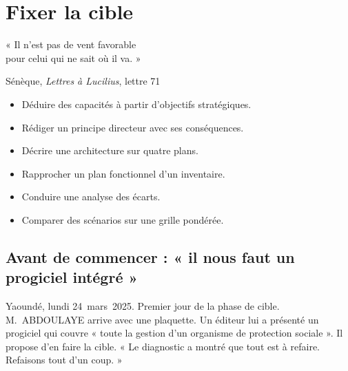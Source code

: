 
\chapter{Fixer la cible}
\label{chap:cible}

\epigraph{%
    « Il n'est pas de vent favorable\\
    pour celui qui ne sait où il va. »%
}{Sénèque, \textit{Lettres à Lucilius}, lettre 71}


\begin{boxobjectifs}
\begin{itemize}
    \item Déduire des capacités à partir d'objectifs stratégiques.
    \item Rédiger un principe directeur avec ses conséquences.
    \item Décrire une architecture sur quatre plans.
    \item Rapprocher un plan fonctionnel d'un inventaire.
    \item Conduire une analyse des écarts.
    \item Comparer des scénarios sur une grille pondérée.
\end{itemize}
\end{boxobjectifs}

\bigskip

\section*{Avant de commencer : « il nous faut un progiciel intégré »}

Yaoundé, lundi 24~mars~2025. Premier jour de la phase de cible. M.~ABDOULAYE arrive avec une plaquette. Un
éditeur lui a présenté un progiciel qui couvre « toute la gestion d'un organisme de protection sociale ». Il
propose d'en faire la cible. « Le diagnostic a montré que tout est à refaire. Refaisons tout d'un coup. »

